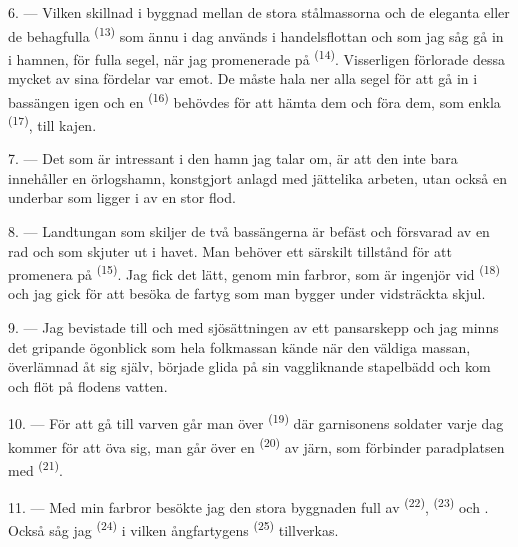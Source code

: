 6. --- Vilken skillnad i byggnad mellan de stora stålmassorna och de eleganta
 eller de behagfulla 
\textsuperscript{(13)} som ännu i dag används i handelsflottan och som jag såg gå in i hamnen,
för fulla segel, när jag promenerade på  \textsuperscript{(14)}. Visserligen
förlorade dessa mycket av sina fördelar
  var emot. De måste hala ner alla segel för att gå in
i bassängen igen och en  \textsuperscript{(16)} behövdes för att hämta dem
och föra dem, som enkla  \textsuperscript{(17)}, till kajen.

\VUsaut{3.0mm}
\VUsaut{3.0mm}

7. --- Det som är intressant i den hamn jag talar om, är att den inte bara innehåller en
örlogshamn, konstgjort anlagd med jättelika arbeten, utan också en underbar
 som ligger i  av en stor flod.

8. --- Landtungan som skiljer de två bassängerna är befäst och försvarad av en rad
 och  som skjuter ut i havet. Man behöver ett särskilt
tillstånd för att promenera på  \textsuperscript{(15)}. Jag fick det lätt,
genom min farbror, som är ingenjör vid
 \textsuperscript{(18)} och jag gick för att besöka de fartyg som
man bygger under vidsträckta skjul.

9. --- Jag bevistade till och med sjösättningen av ett pansarskepp och jag minns det gripande
ögonblick som hela folkmassan kände när den väldiga massan, överlämnad åt sig själv, började
glida på sin vaggliknande stapelbädd och kom och flöt på flodens vatten.

10. --- För att gå till varven går man över  \textsuperscript{(19)} där
garnisonens soldater varje dag kommer för att öva sig, man går över en 
\textsuperscript{(20)} av järn, som förbinder paradplatsen med 
\textsuperscript{(21)}.

\VUsaut{3.0mm}
\VUsaut{3.0mm}

11. --- Med min farbror besökte jag den stora byggnaden full av 
\textsuperscript{(22)},  \textsuperscript{(23)} och
. Också såg jag 
\textsuperscript{(24)} i vilken ångfartygens  \textsuperscript{(25)}
tillverkas.

